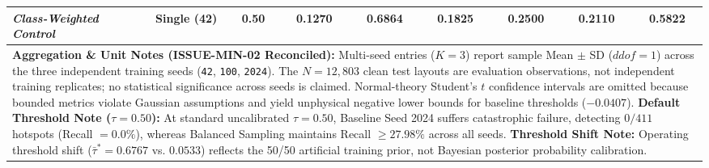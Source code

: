 \begin{table}[t]
\begin{tabular}{lcccccccc}
\textit{Class-Weighted Control} & Single (42) & 0.50 & 0.1270 & 0.6864 & 0.1825 & 0.2500 & 0.2110 & 0.5822 \\
\hline
\multicolumn{9}{l}{\parbox{0.96\textwidth}{\vspace{2pt}\footnotesize{\textbf{Aggregation \& Unit Notes (ISSUE-MIN-02 Reconciled):} Multi-seed entries ($K=3$) report sample Mean $\pm$ SD ($ddof=1$) across the three independent training seeds (\texttt{42}, \texttt{100}, \texttt{2024}). The $N=12,803$ clean test layouts are evaluation observations, not independent training replicates; no statistical significance across seeds is claimed. Normal-theory Student's $t$ confidence intervals are omitted because bounded metrics violate Gaussian assumptions and yield unphysical negative lower bounds for baseline thresholds ($-0.0407$). \textbf{Default Threshold Note ($\tau=0.50$):} At standard uncalibrated $\tau=0.50$, Baseline Seed 2024 suffers catastrophic failure, detecting $0/411$ hotspots (Recall $=0.0\%$), whereas Balanced Sampling maintains Recall $\ge 27.98\%$ across all seeds. \textbf{Threshold Shift Note:} Operating threshold shift ($\bar{\tau}^* = 0.6767$ vs. $0.0533$) reflects the 50/50 artificial training prior, not Bayesian posterior probability calibration.}}} \\
\end{tabular}
\end{table}

